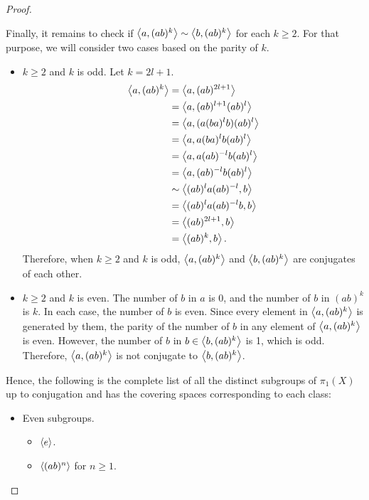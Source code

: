 \documentclass[12pt, psamsfonts]{amsart}
\theoremstyle{definition}
\theoremstyle{remark}
\numberwithin{equation}{section}
\begin{document}
\begin{proof}
\begin{itemize}
      Finally, it remains to check if $\ev{a, (ab)^k} \sim \ev{b, (ab)^k}$ for each $k \geq 2$.
      For that purpose, we will consider two cases based on the parity of $k$.
      \begin{itemize}
        \item
          $k \geq 2$ and $k$ is odd.
          Let $k = 2l + 1$.
          \begin{align*}
            \ev{a, (ab)^k}
              &= \ev{a, (ab)^{2l + 1}} \\
              &= \ev{a, (ab)^{l + 1}(ab)^l} \\
              &= \ev{a, (a(ba)^lb)(ab)^l} \\
              &= \ev{a, a(ba)^lb(ab)^l} \\
              &= \ev{a, a(ab)^{-l}b(ab)^l} \\
              &= \ev{a, (ab)^{-l}b(ab)^l} \\
              &\sim \ev{(ab)^la(ab)^{-l}, b} \\
              &= \ev{(ab)^la(ab)^{-l}b, b} \\
              &= \ev{(ab)^{2l + 1}, b} \\
              &= \ev{(ab)^{k}, b}.
          \end{align*}
          Therefore, when $k \geq 2$ and $k$ is odd, $\ev{a, (ab)^k}$ and $\ev{b, (ab)^k}$ are conjugates of each other.
        \item
          $k \geq 2$ and $k$ is even.
          The number of $b$ in $a$ is 0, and the number of $b$ in $(ab)^k$ is $k$.
          In each case, the number of $b$ is even.
          Since every element in $\ev{a, (ab)^k}$ is generated by them, the parity of the number of $b$ in any element of $\ev{a, (ab)^k}$ is even.
          However, the number of $b$ in $b \in \ev{b, (ab)^k}$ is 1, which is odd.
          Therefore, $\ev{a, (ab)^k}$ is not conjugate to $\ev{b, (ab)^k}$.
      \end{itemize}
    \end{itemize}
  Hence, the following is the complete list of all the distinct subgroups of $\pi_1(X)$ up to conjugation and  has the covering spaces corresponding to each class:
  \begin{itemize}
    \item
      Even subgroups.
      \begin{itemize}
        \item
          $\ev{e}$.
        \item
          $\ev{(ab)^n}$ for $n \geq 1$.

\end{itemize}
\end{itemize}
\end{proof}
\end{document}
